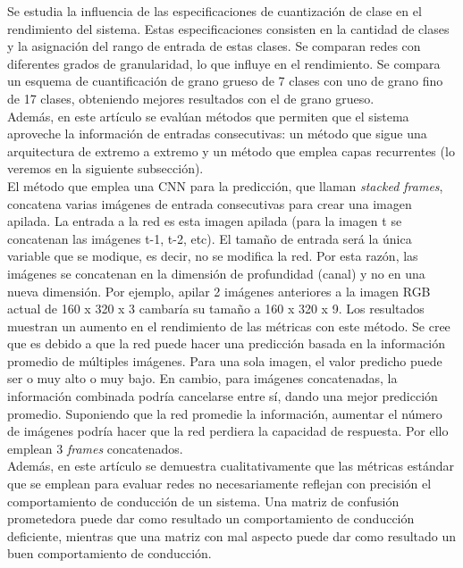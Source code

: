 Se estudia la influencia de las especificaciones de cuantización de clase en el rendimiento del sistema. Estas especificaciones consisten en la cantidad de clases y la asignación del rango de entrada de estas clases. Se comparan redes con diferentes grados de granularidad, lo que influye en el rendimiento. Se compara un esquema de cuantificación de grano grueso de 7 clases con uno de grano fino de 17 clases, obteniendo mejores resultados con el de grano grueso.\\

Además, en este artículo se evalúan métodos que permiten que el sistema aproveche la información de entradas consecutivas: un método que sigue una arquitectura de extremo a extremo y un método que emplea capas recurrentes (lo veremos en la siguiente subsección). \\

El método que emplea una CNN para la predicción, que llaman \textit{stacked frames}, concatena varias imágenes de entrada consecutivas para crear una imagen apilada. La entrada a la red es esta imagen apilada (para la imagen t se concatenan las imágenes t-1, t-2, etc). El tamaño de entrada será la única variable que se modique, es decir, no se modifica la red. Por esta razón, las imágenes se concatenan en la dimensión de profundidad (canal) y no en una nueva dimensión. Por ejemplo, apilar 2 imágenes anteriores a la imagen RGB actual de 160 x 320 x 3 cambaría su tamaño a 160 x 320 x 9. Los resultados muestran un aumento en el rendimiento de las métricas con este método. Se cree que es debido a que la red puede hacer una predicción basada en la información promedio de múltiples imágenes. Para una sola imagen, el valor predicho puede ser o muy alto o muy bajo. En cambio, para imágenes concatenadas, la información combinada podría cancelarse entre sí, dando una mejor predicción promedio. Suponiendo que la red promedie la información, aumentar el número de imágenes podría hacer que la red perdiera la capacidad de respuesta. Por ello emplean 3 \textit{frames} concatenados.\\

Además, en este artículo se demuestra cualitativamente que las métricas estándar que se emplean para evaluar redes no necesariamente reflejan con precisión el comportamiento de conducción de un sistema. Una matriz de confusión prometedora puede dar como resultado un comportamiento de conducción deficiente, mientras que una matriz con mal aspecto puede dar como resultado un buen comportamiento de conducción.




